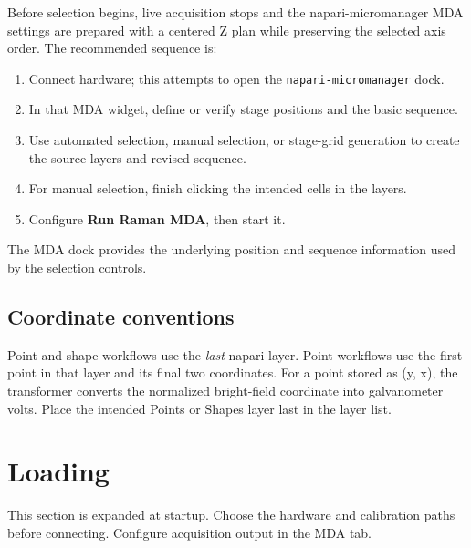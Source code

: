\documentclass[11pt,oneside]{report}
\newcommand{\ui}[1]{\textbf{#1}}
\newcommand{\code}[1]{\texttt{#1}}
\begin{document}
Before selection begins, live acquisition stops and the napari-micromanager MDA
settings are prepared with a centered Z plan while preserving the selected axis
order. The
recommended sequence is:
\begin{enumerate}
  \item Connect hardware; this attempts to open the \code{napari-micromanager} dock.
  \item In that MDA widget, define or verify stage positions and the basic sequence.
  \item Use automated selection, manual selection, or stage-grid generation to
        create the source layers and revised sequence.
  \item For manual selection, finish clicking the intended cells in the layers.
  \item Configure \ui{Run Raman MDA}, then start it.
\end{enumerate}
The MDA dock provides the underlying position and sequence information used by
the selection controls.

\section{Coordinate conventions}
Point and shape workflows use the \emph{last} napari layer. Point workflows use
the first point in that layer and its final two coordinates. For a point stored as
(y, x), the transformer converts the normalized bright-field coordinate into
galvanometer volts. Place the intended Points or Shapes layer last in the layer list.

\chapter{Loading}
This section is expanded at startup. Choose the hardware and calibration paths
before connecting. Configure acquisition output in the MDA tab.
\end{document}
